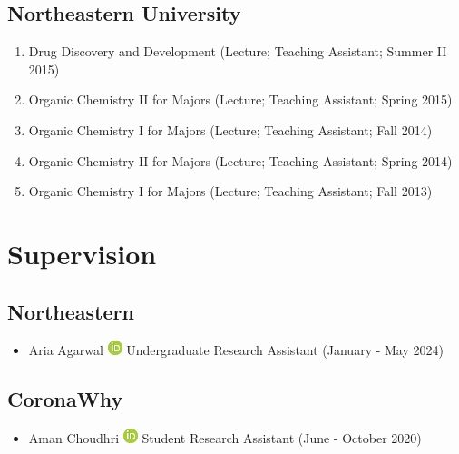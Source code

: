 \documentclass[10pt,a4paper,sans]{moderncv} %
\begin{document}
        \subsection{Northeastern University}
        \begin{enumerate}
        \item     Drug Discovery and Development (Lecture; Teaching Assistant; Summer II 2015)

        \item     Organic Chemistry II for Majors (Lecture; Teaching Assistant; Spring 2015)

        \item     Organic Chemistry I for Majors (Lecture; Teaching Assistant; Fall 2014)

        \item     Organic Chemistry II for Majors (Lecture; Teaching Assistant; Spring 2014)

        \item     Organic Chemistry I for Majors (Lecture; Teaching Assistant; Fall 2013)

        \end{enumerate}

    \section{Supervision}
    \subsection{Northeastern}
        \begin{itemize}
        \item     Aria Agarwal {\scriptsize     \href{https://orcid.org/0009-0008-1788-6318}{\includegraphics[scale=0.5]{img/ORCIDiD_icon16x16}}
}    Undergraduate Research Assistant (January - May 2024)

        \end{itemize}
    \subsection{CoronaWhy}
        \begin{itemize}
        \item     Aman Choudhri {\scriptsize     \href{https://orcid.org/0000-0003-4963-6651}{\includegraphics[scale=0.5]{img/ORCIDiD_icon16x16}}
}    Student Research Assistant (June - October 2020)

        \end{itemize}
\end{document}
